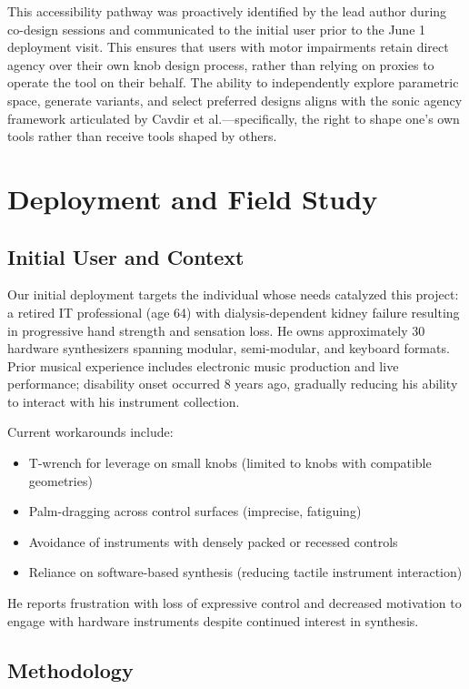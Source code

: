 \documentclass[sigconf]{nimeart}
\begin{document}
This accessibility pathway was proactively identified by the lead author during co-design sessions and communicated to the initial user prior to the June 1 deployment visit. This ensures that users with motor impairments retain direct agency over their own knob design process, rather than relying on proxies to operate the tool on their behalf. The ability to independently explore parametric space, generate variants, and select preferred designs aligns with the sonic agency framework articulated by Cavdir et al.\cite{cavdir2024sonic}—specifically, the right to shape one's own tools rather than receive tools shaped by others.

\section{Deployment and Field Study}

\subsection{Initial User and Context}

Our initial deployment targets the individual whose needs catalyzed this project: a retired IT professional (age 64) with dialysis-dependent kidney failure resulting in progressive hand strength and sensation loss. He owns approximately 30 hardware synthesizers spanning modular, semi-modular, and keyboard formats. Prior musical experience includes electronic music production and live performance; disability onset occurred 8 years ago, gradually reducing his ability to interact with his instrument collection.

Current workarounds include:
\begin{itemize}
\item T-wrench for leverage on small knobs (limited to knobs with compatible geometries)
\item Palm-dragging across control surfaces (imprecise, fatiguing)
\item Avoidance of instruments with densely packed or recessed controls
\item Reliance on software-based synthesis (reducing tactile instrument interaction)
\end{itemize}

He reports frustration with loss of expressive control and decreased motivation to engage with hardware instruments despite continued interest in synthesis.

\subsection{Methodology}
\end{document}
